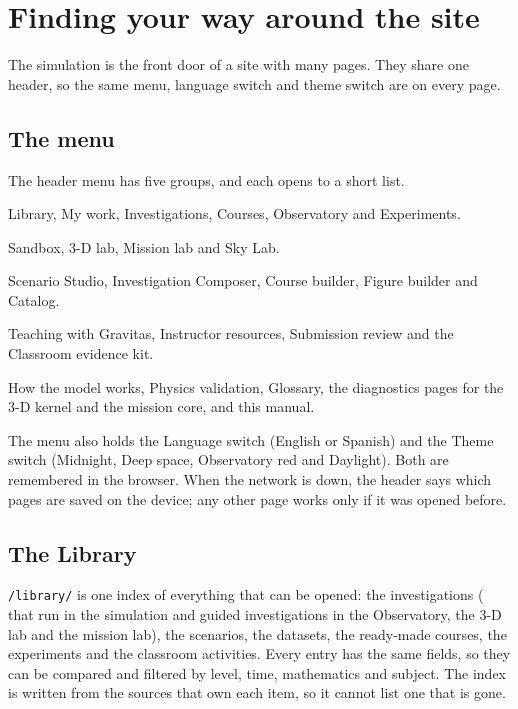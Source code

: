 \documentclass[11pt,a4paper]{article}
\newcommand{\ui}[1]{\textsf{#1}}
\begin{document}
\section{Finding your way around the site}

The simulation is the front door of a site with many pages. They share one
header, so the same menu, language switch and theme switch are on every page.

\subsection{The menu}

The header menu has five groups, and each opens to a short list.

\begin{description}[style=nextline,leftmargin=1em]
  \item[Learn] \ui{Library}, \ui{My work}, \ui{Investigations}, \ui{Courses},
  \ui{Observatory} and \ui{Experiments}.
  \item[Labs] \ui{Sandbox}, \ui{3-D lab}, \ui{Mission lab} and \ui{Sky Lab}.
  \item[Make] \ui{Scenario Studio}, \ui{Investigation Composer},
  \ui{Course builder}, \ui{Figure builder} and \ui{Catalog}.
  \item[Teach] \ui{Teaching with Gravitas}, \ui{Instructor resources},
  \ui{Submission review} and the \ui{Classroom evidence kit}.
  \item[About] \ui{How the model works}, \ui{Physics validation}, \ui{Glossary},
  the diagnostics pages for the 3-D kernel and the mission core, and this manual.
\end{description}

The menu also holds the \ui{Language} switch (English or Spanish) and the
\ui{Theme} switch (Midnight, Deep space, Observatory red and Daylight). Both are
remembered in the browser. When the network is down, the header says which pages
are saved on the device; any other page works only if it was opened before.

\subsection{The Library}

\texttt{/library/} is one index of everything that can be opened: the
\GravLibraryInvestigations{} investigations (\GravInvestigations{} that run in
the simulation and \GravGuidedInvestigations{} guided investigations in the
Observatory, the 3-D lab and the mission lab), the \GravScenarios{} scenarios,
the datasets, the \GravLibraryCourses{} ready-made courses, the experiments and
the classroom activities. Every entry has the same fields, so they can be
compared and filtered by level, time, mathematics and subject. The index is
written from the sources that own each item, so it cannot list one that is gone.
\end{document}
